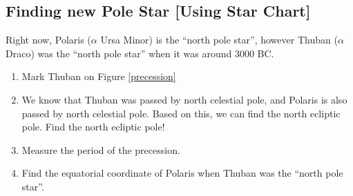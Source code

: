 \documentclass[a4paper,12pt]{extarticle}
\begin{document}
\subsection*{Finding new Pole Star [Using Star Chart]}
Right now, Polaris ($\alpha$ Ursa Minor) is the ``north pole star'', however Thuban ($\alpha$ Draco) was the ``north pole star'' when it was around 3000 BC.

\begin{enumerate}[Q1.]
	\itemsep0em 
	\item Mark Thuban on Figure \ref{precession}
	\item We know that Thuban was passed by north celestial pole, and Polaris is also passed by north celestial pole. Based on this, we can find the north ecliptic pole. Find the north ecliptic pole!
	\item Measure the period of the precession.
	\item Find the equatorial coordinate of Polaris when Thuban was the ``north pole star''.
\end{enumerate}
\end{document}
